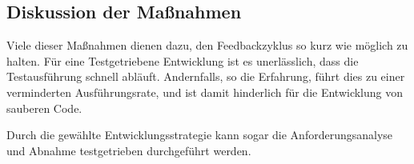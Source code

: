 \subsection{Diskussion der Maßnahmen}

Viele dieser Maßnahmen dienen dazu, den Feedbackzyklus so kurz wie möglich zu halten. Für eine Testgetriebene Entwicklung ist es unerlässlich, dass die Testausführung schnell abläuft. Andernfalls, so die Erfahrung, führt dies zu einer verminderten Ausführungsrate, und ist damit hinderlich für die Entwicklung von sauberen Code.

Durch die gewählte Entwicklungsstrategie kann sogar die Anforderungsanalyse und Abnahme testgetrieben durchgeführt werden. 